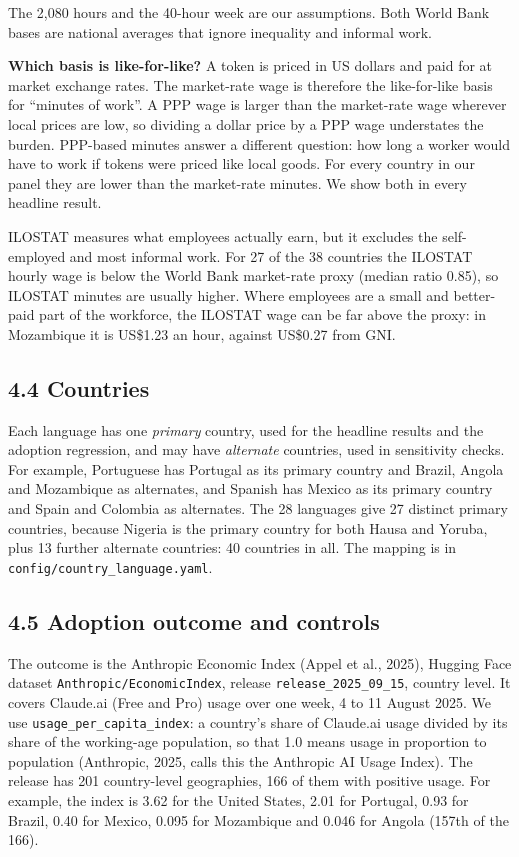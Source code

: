 \documentclass[11pt]{article}
\begin{document}
The 2,080 hours and the 40-hour week are our assumptions. Both World Bank bases are national averages that ignore inequality and informal work.

\textbf{Which basis is like-for-like?} A token is priced in US dollars and paid for at market exchange rates. The market-rate wage is therefore the like-for-like basis for ``minutes of work''. A PPP wage is larger than the market-rate wage wherever local prices are low, so dividing a dollar price by a PPP wage understates the burden. PPP-based minutes answer a different question: how long a worker would have to work if tokens were priced like local goods. For every country in our panel they are lower than the market-rate minutes. We show both in every headline result.

ILOSTAT measures what employees actually earn, but it excludes the self-employed and most informal work. For 27 of the 38 countries the ILOSTAT hourly wage is below the World Bank market-rate proxy (median ratio 0.85), so ILOSTAT minutes are usually higher. Where employees are a small and better-paid part of the workforce, the ILOSTAT wage can be far above the proxy: in Mozambique it is US\$1.23 an hour, against US\$0.27 from GNI.

\subsection{4.4 Countries}

Each language has one \emph{primary} country, used for the headline results and the adoption regression, and may have \emph{alternate} countries, used in sensitivity checks. For example, Portuguese has Portugal as its primary country and Brazil, Angola and Mozambique as alternates, and Spanish has Mexico as its primary country and Spain and Colombia as alternates. The 28 languages give 27 distinct primary countries, because Nigeria is the primary country for both Hausa and Yoruba, plus 13 further alternate countries: 40 countries in all. The mapping is in \texttt{config/country\_language.yaml}.

\subsection{4.5 Adoption outcome and controls}

The outcome is the Anthropic Economic Index (Appel et al., 2025), Hugging Face dataset \texttt{Anthropic/EconomicIndex}, release \texttt{release\_2025\_09\_15}, country level. It covers Claude.ai (Free and Pro) usage over one week, 4 to 11 August 2025. We use \texttt{usage\_per\_capita\_index}: a country's share of Claude.ai usage divided by its share of the working-age population, so that 1.0 means usage in proportion to population (Anthropic, 2025, calls this the Anthropic AI Usage Index). The release has 201 country-level geographies, 166 of them with positive usage. For example, the index is 3.62 for the United States, 2.01 for Portugal, 0.93 for Brazil, 0.40 for Mexico, 0.095 for Mozambique and 0.046 for Angola (157th of the 166).
\end{document}

